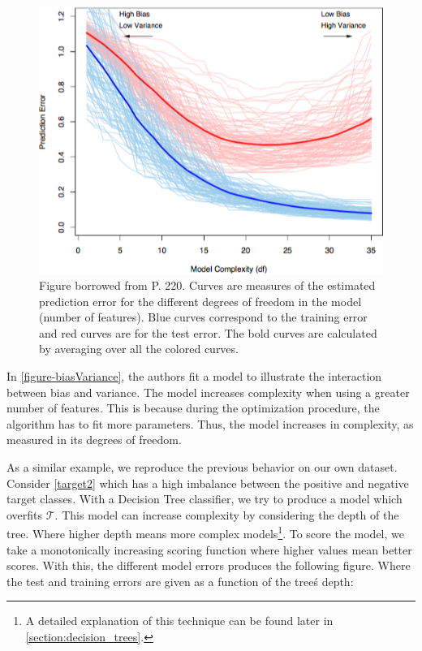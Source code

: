 
\begin{figure}[h!]
\begin{center}
\includegraphics[width=0.7\columnwidth]{figures/figure-biasVariance/figure-biasVariance}
\caption{ Figure borrowed from \protect\textcite{hastie-elemstatslearn} P. 220. Curves are measures of the estimated prediction error for the different degrees of freedom in the model (number of features). Blue curves correspond to the training error and red curves are for the test error. The bold curves are calculated by averaging over all the colored curves.%
}
\label{figure:biasVariance}
\end{center}
\end{figure}


In \cref{figure-biasVariance}, the authors fit a model to illustrate the interaction between bias and variance. The model increases complexity when using a greater number of features. This is because during the optimization procedure, the algorithm has to fit more parameters. Thus, the model increases in complexity, as measured in its degrees of freedom.

As a similar example, we reproduce the previous behavior on our own dataset.
Consider \cref{target2} which has a high imbalance between the positive and negative target classes.
With a Decision Tree classifier, we try to produce a model which overfits $\mathcal{T}$. This model can increase complexity by considering the depth of the tree. Where higher depth means more complex models\footnote{A detailed explanation of this technique can be found later in \cref{section:decision_trees}. }.
To score the model, we take a monotonically increasing scoring function where
higher values mean better scores.
With this, the different model errors produces the following figure. Where the test and training errors are given as a function of the tree\'s depth:


